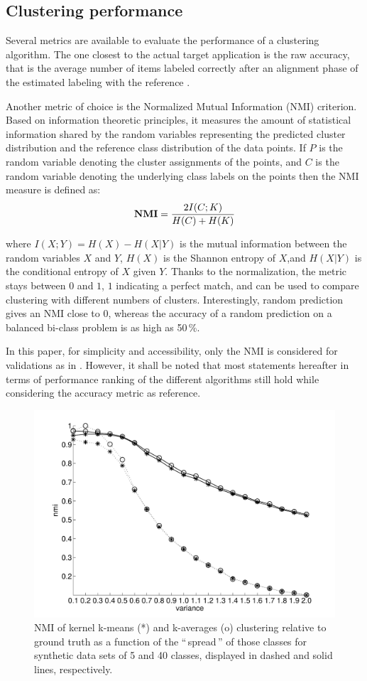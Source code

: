 \documentclass[natbib,smallextended]{svjour3}
\newcommand{\gl}[1]{``\,#1\,''} %
\begin{document}
\subsection{Clustering performance}

Several metrics are available to evaluate the performance of a clustering algorithm. The one closest to the actual target application is the raw accuracy, that is the average number of items labeled correctly after an alignment phase of the estimated labeling with the reference \citep{Kuhn1955Hungarian}.

Another metric of choice is the Normalized Mutual Information (NMI) criterion. Based on information theoretic principles, it measures the amount of statistical information shared by the random variables representing the predicted cluster distribution and the reference class distribution of the data points. If $P$ is the random variable denoting the cluster assignments of the points, and $C$ is the random variable denoting the underlying class labels on the points then the NMI measure is defined as:
\[
\textbf{NMI} = \frac{ 2\- I(C;K) }{H(C)+H(K)}
\]

where $I(X;Y)=H(X)−H(X|Y)$ is the mutual information between the random variables $X$ and $Y$, $H(X)$ is the Shannon entropy of $X$,and $H(X|Y)$ is the conditional entropy of $X$ given $Y$. Thanks to the normalization, the metric stays between $0$ and $1$, $1$ indicating a perfect match, and can be used to compare clustering with different numbers of clusters. Interestingly, random prediction gives an NMI close to $0$, whereas the accuracy of a random prediction on a balanced bi-class problem is as high as 50\,\%.

In this paper, for simplicity and accessibility, only the NMI is considered for validations as in \citep{Kulis2008}. However, it shall be noted that most statements hereafter in terms of performance ranking of the different algorithms still hold while considering the accuracy metric as reference.

\begin{figure}
\center
\includegraphics[width=.7\textwidth]{figures/synthetic.pdf}
\caption{NMI of kernel k-means (*) and k-averages (o) clustering relative to ground truth as a function of the \gl{spread} of those classes for synthetic data sets of 5 and 40 classes, displayed in dashed and solid lines, respectively.}
\label{fig:synth_perf}
\end{figure}
\end{document}
